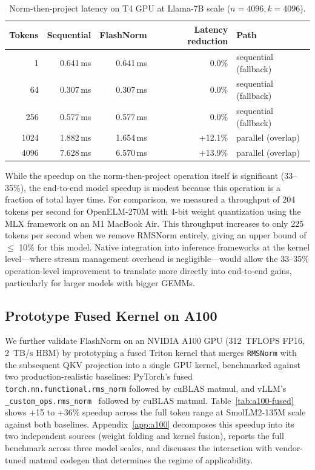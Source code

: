 \documentclass{article}
\begin{document}
\begin{table}[h!] \centering
\caption{Norm-then-project latency on T4 GPU at Llama-7B scale ($n{=}4096, k{=}4096$).}
\label{tab:overlap7b}
\begin{tabular}{r r r r l}
\hline
Tokens & Sequential & FlashNorm & Latency reduction & Path \\
\hline
1      & 0.641\,ms & 0.641\,ms & $0.0$\% & sequential (fallback) \\
64     & 0.307\,ms & 0.307\,ms & $0.0$\% & sequential (fallback) \\
256    & 0.577\,ms & 0.577\,ms & $0.0$\% & sequential (fallback) \\
1024   & 1.882\,ms & 1.654\,ms & $+$12.1\% & parallel (overlap) \\
4096   & 7.628\,ms & 6.570\,ms & $+$13.9\% & parallel (overlap) \\
\hline
\end{tabular}
\end{table}

While the speedup on the norm-then-project operation itself is significant (33--35\%), the end-to-end model speedup is modest because this operation is a fraction of total layer time. For comparison, we measured a throughput of 204 tokens per second for OpenELM-270M with 4-bit weight quantization using the MLX framework on an M1 MacBook Air. This throughput increases to only 225 tokens per second when we remove RMSNorm entirely, giving an upper bound of $\leq$ 10\% for this model. Native integration into inference frameworks at the kernel level---where stream management overhead is negligible---would allow the 33--35\% operation-level improvement to translate more directly into end-to-end gains, particularly for larger models with bigger GEMMs.

\subsection{Prototype Fused Kernel on A100}\label{sec:a100-fused}

We further validate FlashNorm on an NVIDIA A100 GPU (312~TFLOPS FP16, 2~TB/s HBM) by prototyping a fused Triton kernel that merges \texttt{RMSNorm} with the subsequent QKV projection into a single GPU kernel, benchmarked against two production-realistic baselines: PyTorch's fused \texttt{torch.nn.functional.rms\_norm} followed by cuBLAS matmul, and vLLM's \texttt{\_custom\_ops.rms\_norm}~\citep{vLLM} followed by cuBLAS matmul. Table~\ref{tab:a100-fused} shows +15 to +36\% speedup across the full token range at SmolLM2-135M scale against both baselines. Appendix~\ref{app:a100} decomposes this speedup into its two independent sources (weight folding and kernel fusion), reports the full benchmark across three model scales, and discusses the interaction with vendor-tuned matmul codegen that determines the regime of applicability.
\end{document}
